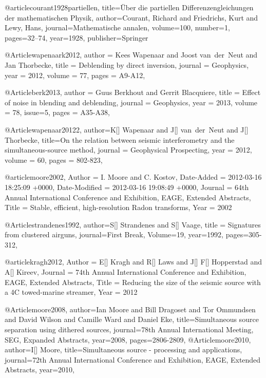 @article{courant1928partiellen,
  title={{\"U}ber die partiellen Differenzengleichungen der mathematischen Physik},
  author={Courant, Richard and Friedrichs, Kurt and Lewy, Hans},
  journal={Mathematische annalen},
  volume={100},
  number={1},
  pages={32--74},
  year={1928},
  publisher={Springer}
}

@Article{wapenaark2012,
  author = 	 {Kees Wapenaar and Joost van~der~Neut and Jan Thorbecke},
  title = 	 {Deblending by direct inversion},
  journal = 	 {Geophysics},
  year = 	 2012,
  volume =	 77,
  pages =	 {A9-A12},
}

@Article{berk2013,
  author = 	 {Guus Berkhout and Gerrit Blacquiere},
  title = 	 {Effect of noise in blending and deblending},
  journal = 	 {Geophysics},
  year = 	 2013,
  volume =	 78,
  issue=5,
  pages =	 {A35-A38},
}


@Article{wapenaar20122,
  author={K[] Wapenaar and J[] van~der~Neut and J[] Thorbecke},
  title={On the relation between seismic interferometry and the simultaneous-source method},
  journal = 	 {Geophysical Prospecting},
  year = 	 2012,
  volume =	 60,
  pages =	 {802-823},
}

@article{moore2002,
	Author = {I. Moore and C. Kostov},
	Date-Added = {2012-03-16 18:25:09 +0000},
	Date-Modified = {2012-03-16 19:08:49 +0000},
	Journal = {64th Annual International Conference and Exhibition, EAGE, Extended Abstracts},
	Title = {Stable, efficient, high-resolution {R}adon transforms},
	Year = {2002}}

@Article{strandenes1992,
  author={S[] Strandenes and S[] Vaage},
  title = {Signatures from clustered airguns},
  journal={First Break},
  Volume=19,
  year=1992,
  pages={305-312},
}

@article{kragh2012,
	Author = {E[] Kragh and R[] Laws and J[] F[] Hopperstad and A[] Kireev},
	Journal = {74th Annual International Conference and Exhibition, EAGE, Extended Abstracts},
	Title = {Reducing the size of the seismic source with a 4C towed-marine streamer},
	Year = {2012}}


@Article{moore2008,
  author={Ian Moore and Bill Dragoset and Tor Ommundsen and David Wilson and Camille Ward and Daniel Eke},
  title={Simultaneous source separation using dithered sources},
  journal={78th Annual International Meeting, SEG, Expanded Abstracts},
  year=2008,
  pages={2806-2809},
}
@Article{moore2010,
  author={I[] Moore},
  title={Simultaneous source - processing and applications},
  journal={72th Annual International Conference and Exhibition, EAGE, Extended Abstracts},
  year=2010,
}


